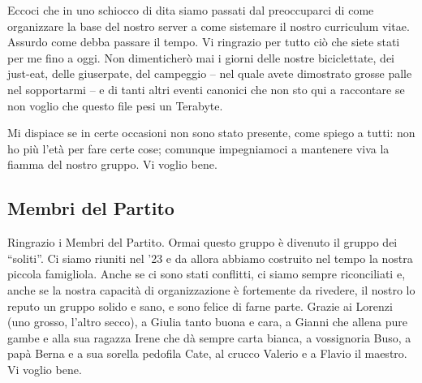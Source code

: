 Eccoci che in uno schiocco di dita siamo passati dal preoccuparci di
come organizzare la base del nostro server a come sistemare il nostro
curriculum vitae. Assurdo come debba passare il tempo. Vi ringrazio per
tutto ciò che siete stati per me fino a oggi. Non dimenticherò mai i
giorni delle nostre biciclettate, dei just-eat, delle giuserpate, del
campeggio -- nel quale avete dimostrato grosse palle nel sopportarmi --
e di tanti altri eventi canonici che non sto qui a raccontare se non
voglio che questo file pesi un Terabyte.

Mi dispiace se in certe occasioni non sono stato presente, come spiego
a tutti: non ho più l'età per fare certe cose; comunque impegniamoci a
mantenere viva la fiamma del nostro gruppo. Vi voglio bene.

\subsection{Membri del Partito}
Ringrazio i Membri del Partito. Ormai questo
gruppo è divenuto il gruppo dei ``soliti''. Ci siamo riuniti nel '23 e
da allora abbiamo costruito nel tempo la nostra piccola famigliola.
Anche se ci sono stati conflitti, ci siamo sempre riconciliati e, anche
se la nostra capacità di organizzazione è fortemente da rivedere, il
nostro lo reputo un gruppo solido e sano, e sono felice di farne parte.
Grazie ai Lorenzi (uno grosso, l'altro secco), a Giulia tanto buona e
cara, a Gianni che allena pure gambe e alla sua ragazza Irene che dà
sempre carta bianca, a vossignoria Buso, a papà Berna e a sua sorella pedofila
Cate, al crucco Valerio e a Flavio il maestro. Vi voglio bene.

